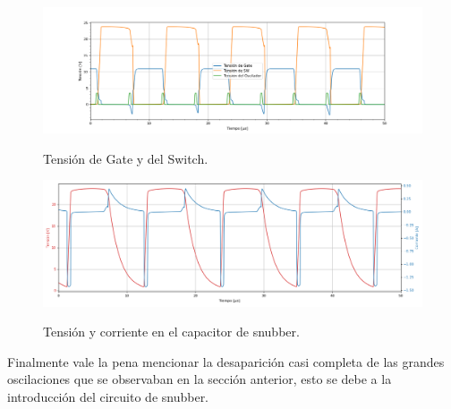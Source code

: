 \begin{figure}[H]
	\centering
	\includegraphics[width=\linewidth]{ImagenesParteIII/TensionesVarias1.png}
	\label{fig:tensionesvarias}
	\caption{Tensión de Gate y del Switch.}
\end{figure}
\begin{figure}[H]
	\centering
	\includegraphics[width=0.9\linewidth]{ImagenesParteIII/Cap_snub.png}
	\label{fig:tensionesvarias}
	\caption{Tensión y corriente en el capacitor de snubber.}
\end{figure}
Finalmente vale la pena mencionar la desaparición casi completa de las grandes oscilaciones que se observaban en la sección anterior, esto se debe a la introducción del circuito de snubber.
%
